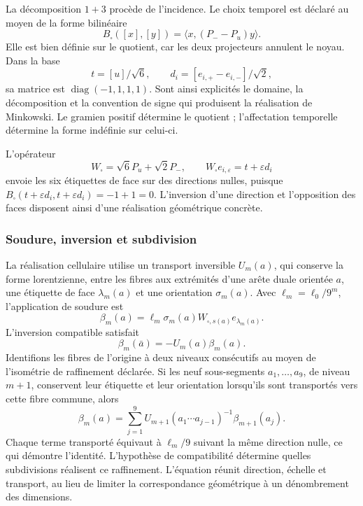La décomposition \(1+3\) procède de l'incidence. Le choix temporel
est déclaré au moyen de la forme bilinéaire
\[
 B_\square([x],[y])=\langle x,(P_--P_u)y\rangle.
\]
Elle est bien définie sur le quotient, car les deux projecteurs annulent le
noyau. Dans la base
\[
 t=[u]/\sqrt6,\qquad
 d_i=[e_{i,+}-e_{i,-}]/\sqrt2,
\]
sa matrice est \(\operatorname{diag}(-1,1,1,1)\). Sont ainsi explicités
le domaine, la décomposition et la convention de signe qui produisent
la réalisation de Minkowski. Le gramien positif détermine le quotient ;
l'affectation temporelle détermine la forme indéfinie sur celui-ci.

L'opérateur
\[
 W_\square=\sqrt6P_u+\sqrt2P_-,\qquad
 W_\square e_{i,\varepsilon}=t+\varepsilon d_i
\]
envoie les six étiquettes de face sur des directions nulles, puisque
\(B_\square(t+\varepsilon d_i,t+\varepsilon d_i)=-1+1=0\).
L'inversion d'une direction et l'opposition des faces disposent ainsi
d'une réalisation géométrique concrète.

\subsubsection{Soudure, inversion et subdivision}

La réalisation cellulaire utilise un transport inversible \(U_m(a)\),
qui conserve la forme lorentzienne, entre les fibres aux extrémités d'une
arête duale orientée \(a\), une étiquette
de face \(\lambda_m(a)\) et une orientation \(\sigma_m(a)\).
Avec \(\ell_m=\ell_0/9^m\), l'application de soudure est
\[
 \beta_m(a)=\ell_m\sigma_m(a)
 W_{\square,s(a)}e_{\lambda_m(a)}.
\]
L'inversion compatible satisfait
\[
 \beta_m(\bar a)=-U_m(a)\beta_m(a).
\]
Identifions les fibres de l'origine à deux niveaux consécutifs au moyen de l'isométrie de raffinement déclarée. Si les neuf sous-segments \(a_1,\ldots,a_9\), de niveau \(m+1\), conservent leur étiquette et leur orientation lorsqu'ils sont transportés vers cette fibre commune, alors
\begin{equation}
 \beta_m(a)=\sum_{j=1}^9
 U_{m+1}(a_1\cdots a_{j-1})^{-1}\beta_{m+1}(a_j).
 \label{x_reciprocidad:eq:soldadura-refinamiento}
\end{equation}
Chaque terme transporté équivaut à \(\ell_m/9\) suivant la même
direction nulle, ce qui démontre l'identité. L'hypothèse de
compatibilité détermine quelles subdivisions réalisent ce raffinement.
L'équation réunit direction, échelle et transport, au lieu de limiter
la correspondance géométrique à un dénombrement des dimensions.

